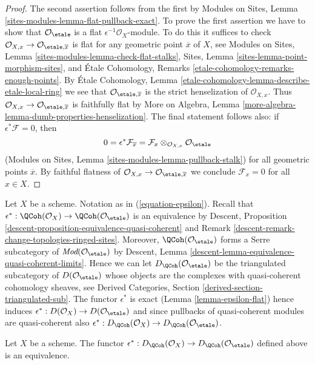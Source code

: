 \begin{proof}
The second assertion follows from the first by
Modules on Sites, Lemma \ref{sites-modules-lemma-flat-pullback-exact}.
To prove the first assertion we have to show that
$\mathcal{O}_\etale$ is a flat $\epsilon^{-1}\mathcal{O}_X$-module.
To do this it suffices to check
$\mathcal{O}_{X, x} \to \mathcal{O}_{\etale, \overline{x}}$
is flat for any geometric point $\overline{x}$ of $X$, see
Modules on Sites, Lemma
\ref{sites-modules-lemma-check-flat-stalks},
Sites, Lemma
\ref{sites-lemma-point-morphism-sites},
and
\'Etale Cohomology, Remarks
\ref{etale-cohomology-remarks-enough-points}.
By \'Etale Cohomology, Lemma
\ref{etale-cohomology-lemma-describe-etale-local-ring}
we see that $\mathcal{O}_{\etale, \overline{x}}$ is the
strict henselization of $\mathcal{O}_{X, x}$. Thus
$\mathcal{O}_{X, x} \to \mathcal{O}_{\etale, \overline{x}}$
is faithfully flat by More on Algebra,
Lemma \ref{more-algebra-lemma-dumb-properties-henselization}.
The final statement follows also: if $\epsilon^*\mathcal{F} = 0$, then
$$
0 = \epsilon^*\mathcal{F}_{\overline{x}} =
\mathcal{F}_x \otimes_{\mathcal{O}_{X, x}} \mathcal{O}_\etale
$$
(Modules on Sites, Lemma \ref{sites-modules-lemma-pullback-stalk})
for all geometric points $\overline{x}$. By faithful flatness of
$\mathcal{O}_{X, x} \to \mathcal{O}_{\etale, \overline{x}}$
we conclude $\mathcal{F}_x = 0$ for all $x \in X$.
\end{proof}

\noindent
Let $X$ be a scheme. Notation as in (\ref{equation-epsilon}).
Recall that $\epsilon^* : \QCoh(\mathcal{O}_X)
\to \QCoh(\mathcal{O}_\etale)$
is an equivalence by
Descent, Proposition \ref{descent-proposition-equivalence-quasi-coherent} and
Remark \ref{descent-remark-change-topologies-ringed-sites}.
Moreover, $\QCoh(\mathcal{O}_\etale)$ forms a
Serre subcategory of
$\textit{Mod}(\mathcal{O}_\etale)$ by
Descent, Lemma \ref{descent-lemma-equivalence-quasi-coherent-limits}.
Hence we can let $D_\QCoh(\mathcal{O}_\etale)$ be the triangulated
subcategory of $D(\mathcal{O}_\etale)$ whose objects are the
complexes with quasi-coherent cohomology sheaves, see
Derived Categories, Section \ref{derived-section-triangulated-sub}.
The functor $\epsilon^*$ is exact (Lemma \ref{lemma-epsilon-flat})
hence induces
$\epsilon^* :  D(\mathcal{O}_X) \to D(\mathcal{O}_\etale)$
and since pullbacks of quasi-coherent modules are quasi-coherent
also $\epsilon^* : D_\QCoh(\mathcal{O}_X) \to
D_\QCoh(\mathcal{O}_\etale)$.

\begin{lemma}
\label{lemma-derived-quasi-coherent-small-etale-site}
Let $X$ be a scheme. The functor
$\epsilon^* : D_\QCoh(\mathcal{O}_X) \to
D_\QCoh(\mathcal{O}_\etale)$
defined above is an equivalence.
\end{lemma}

